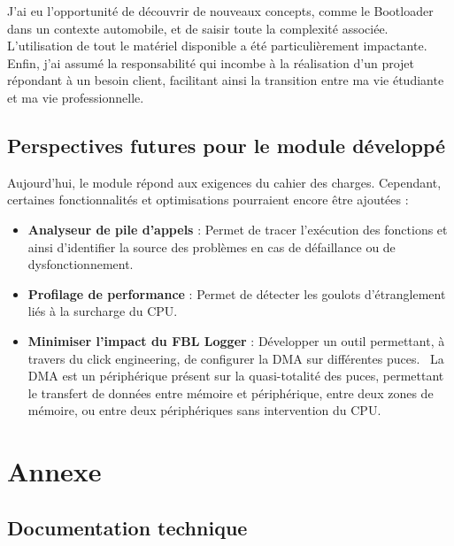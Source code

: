 \documentclass[a4paper, 12pt]{report}
\begin{document}
J’ai eu l’opportunité de découvrir de nouveaux concepts, comme le Bootloader dans un contexte automobile, et de saisir toute la complexité associée. L'utilisation de tout le matériel disponible a été particulièrement impactante.\\

Enfin, j'ai assumé la responsabilité qui incombe à la réalisation d’un projet répondant à un besoin client, facilitant ainsi la transition entre ma vie étudiante et ma vie professionnelle.

\section{Perspectives futures pour le module développé}
    Aujourd'hui, le module répond aux exigences du cahier des charges. Cependant, certaines fonctionnalités et optimisations pourraient encore être ajoutées :
    \\
    \begin{itemize}
    \item \textbf{Analyseur de pile d'appels} : Permet de tracer l'exécution des fonctions et ainsi d’identifier la source des problèmes en cas de défaillance ou de dysfonctionnement.
    \item \textbf{Profilage de performance} : Permet de détecter les goulots d'étranglement liés à la surcharge du \ac{CPU}.
    \item \textbf{Minimiser l'impact du FBL Logger} : Développer un outil permettant, à travers du click engineering, de configurer la \ac{DMA} sur différentes puces. \
    La DMA est un périphérique présent sur la quasi-totalité des puces, permettant le transfert de données entre mémoire et périphérique, entre deux zones de mémoire, ou entre deux périphériques sans intervention du \ac{CPU}.
    \end{itemize}




\printbibliography[
heading=bibintoc, title={Bibliographie}] 


\appendix
\chapter{\textbf{Annexe}}
\section{Documentation technique}
\end{document}
